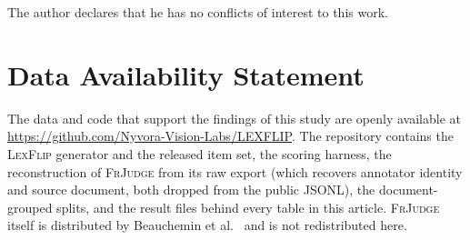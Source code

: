 \documentclass{BVP_JCLLT}
\begin{document}
The author declares that he has no conflicts of interest to this work.

\section*{Data Availability Statement}\label{data-availability-statement}

The data and code that support the findings of this study are openly available
at \url{https://github.com/Nyvora-Vision-Labs/LEXFLIP}. The repository contains
the \textsc{LexFlip} generator and the released item set, the scoring harness,
the reconstruction of \textsc{FrJudge} from its raw export (which recovers
annotator identity and source document, both dropped from the public JSONL), the
document-grouped splits, and the result files behind every table in this
article. \textsc{FrJudge} itself is distributed by Beauchemin et al.\
\cite{beauchemin2025judgebert} and is not redistributed here.

\flushbottom
\begingroup
\setlength{\parskip}{0pt}

\endgroup
\end{document}
